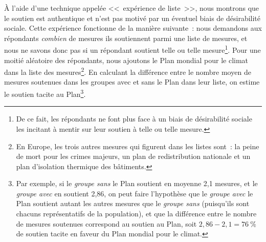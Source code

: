 \documentclass[a5paper,french,openany]{memoir}
\begin{document}
À l'aide d'une technique appelée <<~expérience de liste~>>, nous montrons que le soutien est authentique et n'est pas motivé par un éventuel biais de désirabilité sociale. Cette expérience fonctionne de la manière suivante~: nous demandons aux répondants \textit{combien} de mesures ils soutiennent parmi une liste de mesures, et nous ne savons donc pas si un répondant soutient telle ou telle mesure\footnote{De ce fait, les répondants ne font plus face à un biais de désirabilité sociale les incitant à mentir sur leur soutien à telle ou telle mesure.}. 
Pour une moitié aléatoire des répondants, nous ajoutons le Plan mondial pour le climat dans la liste des mesures\footnote{En Europe, les trois autres mesures qui figurent dans les listes sont~: la peine de mort pour les crimes majeurs, un plan de redistribution nationale et un plan d'isolation thermique des bâtiments.}. 
En calculant la différence entre le nombre moyen de mesures soutenues dans les groupes avec et sans le Plan dans leur liste, on estime le soutien tacite au Plan\footnote{Par exemple, si le \textit{groupe sans} le Plan soutient en moyenne 2,1 mesures, et le \textit{groupe avec} en soutient 2,86, on peut faire l'hypothèse que le \textit{groupe avec} le Plan soutient autant les autres mesures que le \textit{groupe sans} (puisqu'ils sont chacuns représentatifs de la population), et que la différence entre le nombre de mesures soutenues correspond au soutien au Plan, soit $2,86 - 2,1 = 76~\%$ de soutien tacite en faveur du Plan mondial pour le climat.}. %
\end{document}
